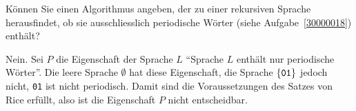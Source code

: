 Können Sie einen Algorithmus angeben, der zu einer rekursiven
Sprache herausfindet, ob sie ausschliesslich periodische Wörter (siehe
Aufgabe~\ref{30000018})
enthält?

\begin{loesung}
Nein. Sei
$P$ die Eigenschaft der Sprache $L$ ``Sprache $L$ enthält
nur periodische Wörter''. Die leere Sprache $\emptyset$
hat diese Eigenschaft, die Sprache $\{{\tt 01}\}$ jedoch nicht,
{\tt 01} ist nicht periodisch.
Damit sind die Voraussetzungen des Satzes von Rice erfüllt, also
ist die Eigenschaft $P$ nicht entscheidbar.
\end{loesung}
